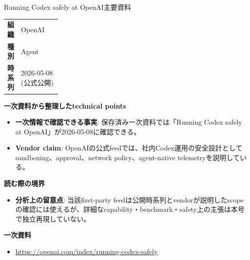 \begin{technicalnote}{Running Codex safely at OpenAI}{主要資料}
\begingroup
\begin{tabularx}{\linewidth}{@{}>{\bfseries}p{0.22\linewidth}X@{}}
組織 & OpenAI \\
種別 & Agent \\
時系列 & 2026-05-08 (公式公開) \\
\end{tabularx}
\smallskip
{\bfseries 一次資料から整理したtechnical points}
\begin{itemize}[leftmargin=1.5em,itemsep=0.35em]
\item \textbf{一次情報で確認できる事実}: 保存済み一次資料では「Running Codex safely at OpenAI」が2026-05-08に確認できる。
\item \textbf{Vendor claim}: OpenAIの公式feedでは、社内Codex運用の安全設計としてsandboxing、approval、network policy、agent-native telemetryを説明している。
\end{itemize}
{\bfseries 読む際の境界}
\begin{itemize}[leftmargin=1.5em,itemsep=0.35em]
\item \textbf{分析上の留意点}: 当該first-party feedは公開時系列とvendorが説明したscopeの確認には使えるが、詳細なcapability・benchmark・safety上の主張は本号で独立再現していない。
\end{itemize}
\begin{samepage}
{\bfseries 一次資料}
\begingroup\sloppy
\begin{itemize}[leftmargin=1.5em,itemsep=0.25em]
\item {\scriptsize\url{https://openai.com/index/running-codex-safely}}
\end{itemize}
\endgroup
\end{samepage}
\endgroup
\end{technicalnote}
\medskip


